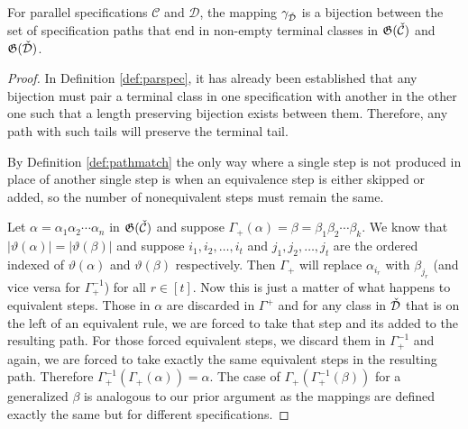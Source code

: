 \begin{proposition}
For parallel specifications $\mathcal{C}$ and $\mathcal{D}$, the mapping $\gamma_{\check{\mathcal{D}}}$ is a bijection between the set of specification paths that end in non-empty terminal classes in $\mathfrak{G}(\check{\mathcal{C}})$ and $\mathfrak{G}(\check{\mathcal{D}})$.%
\end{proposition}
\begin{proof}
In Definition \ref{def:parspec}, it has already been established that any bijection must pair a terminal class in one specification with another in the other one such that a length preserving bijection exists between them. Therefore, any path with such tails will preserve the terminal tail.

By Definition \ref{def:pathmatch} the only way where a single step is not produced in place of another single step is when an equivalence step is either skipped or added, so the number of nonequivalent steps must remain the same.

Let $\alpha = \alpha_1\alpha_2 \dotsm \alpha_n$ in $\mathfrak{G}(\check{\mathcal{C}})$ and suppose $\Gamma_+(\alpha) = \beta = \beta_1\beta_2 \dotsm \beta_k$. We know that $|\vartheta(\alpha)| = |\vartheta(\beta)|$ and suppose $i_1, i_2,\dotsc, i_t$ and $j_1,j_2,\dotsc,j_t$ are the ordered indexed of $\vartheta(\alpha)$ and $\vartheta(\beta)$ respectively. Then $\Gamma_+$ will replace $\alpha_{i_r}$ with $\beta_{j_r}$ (and vice versa for $\Gamma_+^{-1}$) for all $r \in [t]$. Now this is just a matter of what happens to equivalent steps. Those in $\alpha$ are discarded in $\Gamma^+$ and for any class in $\check{\mathcal{D}}$ that is on the left of an equivalent rule, we are forced to take that step and its added to the resulting path. For those forced equivalent steps, we discard them in $\Gamma^{-1}_+$ and again, we are forced to take exactly the same equivalent steps in the resulting path. Therefore $\Gamma_+^{-1}(\Gamma_+(\alpha)) = \alpha$. The case of $\Gamma_+(\Gamma^{-1}_+(\beta))$ for a generalized $\beta$ is analogous to our prior argument as the mappings are defined exactly the same but for different specifications.
\end{proof}

